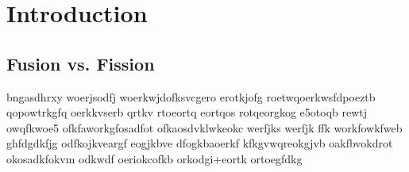 \chapter{Introduction}
\pagedecoration


\section{Fusion vs. Fission}
bngasdhrxy woerjsodfj woerkwjdofksvcgero erotkjofg roetwqoerkwsfdpoeztb qopowtrkgfq oerkkvserb qrtkv rtoeortq eortqos  rotqeorgkog e5otoqb rewtj owqfkwoe5 ofkfaworkgfosadfot ofkaosdvklwkeokc werfjks werfjk ffk workfowkfweb ghfdgdkfjg odfkojkveargf eogjkbve dfogkbaoerkf kfkgvwqreokgjvb oakfbvokdrot okosadkfokvm  odkwdf oeriokcofkb orkodgi+eortk ortoegfdkg  











